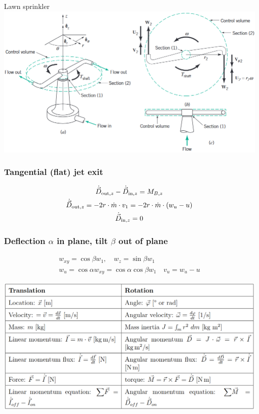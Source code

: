 \documentclass{article}
\begin{document}
\begin{multicols}{2}
\begin{examplebox}{Lawn sprinkler}
    \includegraphics[width=\textwidth]{media/rasensprenger_orig.png}
    \subsubsection{Tangential (flat) jet exit}
    \vspace*{-0.3cm}
    \begin{gather}
        \dot{\vec{D}}_{{\rm out},z} - \dot{\vec{D}}_{{\rm in},z} = M_{B,z} \notag \\
        \dot{\vec{D}}_{{\rm out},z} = -2r\cdot \dot{m}\cdot v_1 = -2r\cdot \dot{m}\cdot \left(w_u - u\right)\\
        \dot{\vec{D}}_{{\rm in},z} = 0
    \end{gather}

    \subsubsection{Deflection $\alpha$ in plane, tilt $\beta$ out of plane}
    \vspace*{-0.3cm}
    \begin{gather}
        w_{xy} = \cos\beta w_1, \quad w_z = \sin\beta w_1 \\
        w_u = \cos\alpha w_{xy} = \cos\alpha\cos\beta w_1 \quad v_u = w_u - u
    \end{gather}
\end{examplebox}
\end{multicols}

\newpage
\thispagestyle{empty}
\includegraphics[width=\textwidth]{media/angular_formulas.png}
\end{document}
